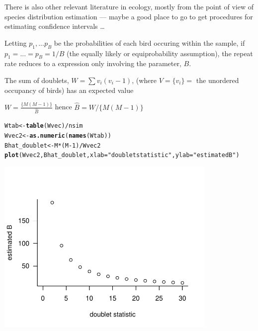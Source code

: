 \documentclass{article}\usepackage[]{graphicx}\usepackage[]{color}
\makeatletter
\newcommand{\hlnum}[1]{\textcolor[rgb]{0.686,0.059,0.569}{#1}}%
\newcommand{\hlstr}[1]{\textcolor[rgb]{0.192,0.494,0.8}{#1}}%
\newcommand{\hlopt}[1]{\textcolor[rgb]{0,0,0}{#1}}%
\newcommand{\hlstd}[1]{\textcolor[rgb]{0.345,0.345,0.345}{#1}}%
\newcommand{\hlkwb}[1]{\textcolor[rgb]{0.69,0.353,0.396}{#1}}%
\newcommand{\hlkwc}[1]{\textcolor[rgb]{0.333,0.667,0.333}{#1}}%
\newcommand{\hlkwd}[1]{\textcolor[rgb]{0.737,0.353,0.396}{\textbf{#1}}}%
\newenvironment{kframe}{%
 \def\at@end@of@kframe{}%
 \ifinner\ifhmode%
  \def\at@end@of@kframe{\end{minipage}}%
  \begin{minipage}{\columnwidth}%
 \fi\fi%
 \def\FrameCommand##1{\hskip\@totalleftmargin \hskip-\fboxsep
 \colorbox{shadecolor}{##1}\hskip-\fboxsep
     \hskip-\linewidth \hskip-\@totalleftmargin \hskip\columnwidth}%
 \MakeFramed {\advance\hsize-\width
   \@totalleftmargin\z@ \linewidth\hsize
   \@setminipage}}%
 {\par\unskip\endMakeFramed%
 \at@end@of@kframe}
\newenvironment{knitrout}{}{} %
\makeatother
\begin{document}
There is also other relevant literature in ecology, mostly from
the point of view of species distribution estimation
\citep{good_population_1953,chao_estimating_1992} --- maybe
a good place to go to get procedures for estimating confidence
intervals \ldots

Letting $p_1,...p_B$ be the probabilities of each bird occuring within the sample, if $p_1=...=p_B = 1/B$ (the equally likely or equiprobability assumption), the repeat rate reduces to a expression only involving the parameter, $B$.

The sum of doublets, $W=\sum v_i (v_i-1)$, (where $V = \{v_i\} = $ the unordered occupancy of birds) has an
expected value

$W = \frac{\{M(M-1)\}}{\hat{B}}$
hence $\hat{B} = W / \{M(M-1)\}$

\begin{knitrout}
\color{fgcolor}\begin{kframe}
\begin{alltt}
\hlstd{Wtab} \hlkwb{<-} \hlkwd{table}\hlstd{(Wvec)}\hlopt{/}\hlstd{nsim}
\hlstd{Wvec2} \hlkwb{<-} \hlkwd{as.numeric}\hlstd{(}\hlkwd{names}\hlstd{(Wtab))}
\hlstd{Bhat_doublet}\hlkwb{<-}\hlstd{M}\hlopt{*}\hlstd{(M}\hlopt{-}\hlnum{1}\hlstd{)}\hlopt{/}\hlstd{Wvec2}
\hlkwd{plot}\hlstd{(Wvec2,Bhat_doublet,}\hlkwc{xlab}\hlstd{=}\hlstr{"doublet statistic"}\hlstd{,}\hlkwc{ylab}\hlstd{=}\hlstr{"estimated B"}\hlstd{)}
\end{alltt}
\end{kframe}
\includegraphics[width=0.8\textwidth]{figure/unnamed-chunk-2-1} 

\end{knitrout}
\end{document}
